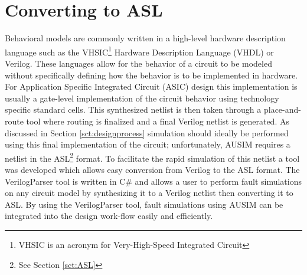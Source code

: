 \documentclass[12pt]{report}
\begin{document}
\section{Converting to ASL}
Behavioral models are commonly written in a high-level hardware description language such as the VHSIC\footnote{VHSIC is an acronym for Very-High-Speed Integrated Circuit} Hardware Description Language (VHDL) or Verilog.  These languages allow for the behavior of a circuit to be modeled without specifically defining how the behavior is to be implemented in hardware.  For Application Specific Integrated Circuit (ASIC) design this implementation is usually a gate-level implementation of the circuit behavior using technology specific standard cells.  This synthesized netlist is then taken through a place-and-route tool where routing is finalized and a final Verilog netlist is generated\cite{advancedverilog}.  As discussed in Section \ref{sct:designprocess} simulation should ideally be performed using this final implementation of the circuit; unfortunately, AUSIM requires a netlist in the ASL\footnote{See Section \ref{sct:ASL}} format.   To facilitate the rapid simulation of this netlist a tool was developed which allows easy conversion from Verilog to the ASL format.  The VerilogParser tool is written in C\#\cite{csharp} and allows a user to perform fault simulations on any circuit model by synthesizing it to a Verilog netlist then converting it to ASL.  By using the VerilogParser tool, fault simulations using AUSIM can be integrated into the design work-flow easily and efficiently.
\end{document}
